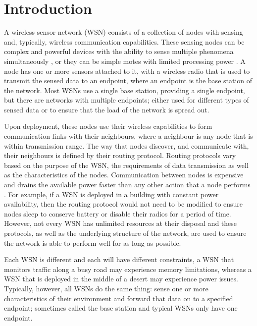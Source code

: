 \chapter{Introduction}
A wireless sensor network (WSN) consists of a collection of nodes with sensing and, typically, wireless communication capabilities. These sensing nodes can be complex and powerful devices with the ability to sense multiple phenomena simultaneously \cite{Maurer, Nachman2008, Sarajevo2014}, or they can be simple motes with limited processing power \cite{Martinez2004, Kays2009, Szewczyk2004b}. A node has one or more sensors attached to it, with a wireless radio that is used to transmit the sensed data to an endpoint, where an endpoint is the base station of the network. Most WSNs use a single base station, providing a single endpoint, but there are networks with multiple endpoints; either used for different types of sensed data or to ensure that the load of the network is spread out.

Upon deployment, these nodes use their wireless capabilities to form communication links with their neighbours, where a neighbour is any node that is within transmission range. The way that nodes discover, and communicate with, their neighbours is defined by their routing protocol. Routing protocols vary based on the purpose of the WSN, the requirements of data transmission as well as the characteristics of the nodes. Communication between nodes is expensive and drains the available power faster than any other action that a node performs \cite{Raghunathan2002}. For example, if a WSN is deployed in a building with constant power availability, then the routing protocol would not need to be modified to ensure nodes sleep to conserve battery or disable their radios for a period of time. However, not every WSN has unlimited resources at their disposal and these protocols, as well as the underlying structure of the network, are used to ensure the network is able to perform well for as long as possible.

Each WSN is different and each will have different constraints, a WSN that monitors traffic along a busy road may experience memory limitations, whereas a  WSN that is deployed in the middle of a desert may experience power issues. Typically, however, all WSNs do the same thing: sense one or more characteristics of their environment and forward that data on to a specified endpoint; sometimes called the base station and typical WSNs only have one endpoint.

